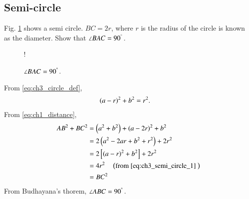 \subsection{Semi-circle}
%
\begin{problem}
Fig. \ref{fig:ch3_semi_circle} shows a semi circle.  $BC = 2r$, where $r$ is the radius of the circle is known as the diameter.  Show that $\angle BAC = 90^{\degree}$.
\end{problem}
\begin{figure}[!h]
\centering
\resizebox {\columnwidth} {!} {

}
\caption{$\angle BAC = 90^{\degree}$.}
\label{fig:ch3_semi_circle}
\end{figure}
%
\proof From \eqref{eq:ch3_circle_def},
\begin{align}
\label{eq:ch3_semi_circle_1}
\left(a-r\right)^2 + b^2 &= r^2.
\end{align}
%
From \eqref{eq:ch1_distance},
%
\begin{align}
AB^2 + BC^2 &= \left(a^2 +b^2\right) + \left(a-2r\right)^2 + b^2
\\
& = 2\left(a^2 - 2ar +b^2 + r^2\right) + 2r^2
\\
& = 2{}\left[\left(a-r\right)^2 +b^2\right] + 2r^2
\\
& = 4r^2 \quad \left(\text{from \eqref{eq:ch3_semi_circle_1} }\right)
\\
&= BC^2
\end{align}
From Budhayana's thorem, $\angle ABC = 90^{\degree}$. 
